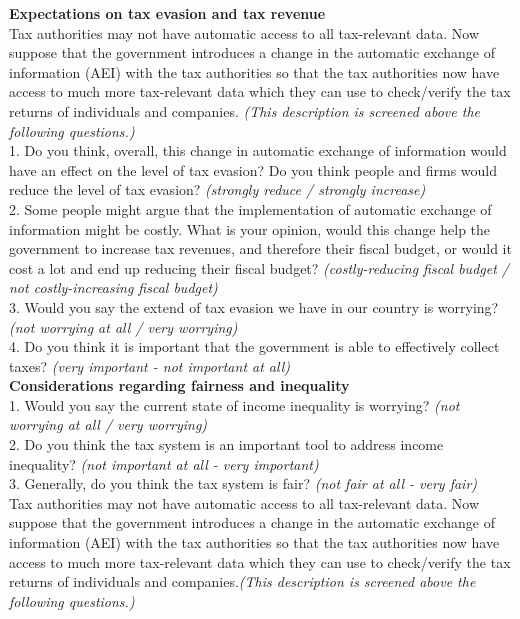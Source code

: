 \documentclass[11pt]{article}
\begin{document}
\textbf{Expectations on tax evasion and tax revenue} \\[0.5em]
Tax authorities may not have automatic access to all tax-relevant data. Now suppose that the government introduces a change in the automatic exchange of information (AEI) with the tax authorities so that the tax authorities now have access to much more tax-relevant data which they can use to check/verify the tax returns of individuals and companies. \textit{(This description is screened above the following questions.)}\\[0.5em]
1. Do you think, overall, this change in automatic exchange of information would have an effect on the level of tax evasion? Do you think people and firms would reduce the level of tax evasion? \textit{(strongly reduce / strongly increase)} \\[0.5em] 
2. Some people might argue that the implementation of automatic exchange of information might be costly. What is your opinion, would this change help the government to increase tax revenues, and therefore their fiscal budget, or would it cost a lot and end up reducing their fiscal budget? \textit{(costly-reducing fiscal budget / not costly-increasing fiscal budget)} \\[0.5em] 
3. Would you say the extend of tax evasion we have in our country is worrying? \textit{(not worrying at all / very worrying)} \\[0.5em] 
4. Do you think it is important that the government is able to effectively collect taxes? \textit{(very important - not important at all)} \\[1em] 
\textbf{Considerations regarding fairness and inequality} \\[0.5em]
1. Would you say the current state of income inequality is worrying? \textit{(not worrying at all / very worrying)}\\[0.5em]
2. Do you think the tax system is an important tool to address income inequality? \textit{(not important at all - very important)} \\[0.5em]
3. Generally, do you think the tax system is fair? \textit{(not fair at all - very fair)} \\[1em]
Tax authorities may not have automatic access to all tax-relevant data. Now suppose that the government introduces a change in the automatic exchange of information (AEI) with the tax authorities so that the tax authorities now have access to much more tax-relevant data which they can use to check/verify the tax returns of individuals and companies.\textit{(This description is screened above the following questions.)}\\[0.5em]
\end{document}
